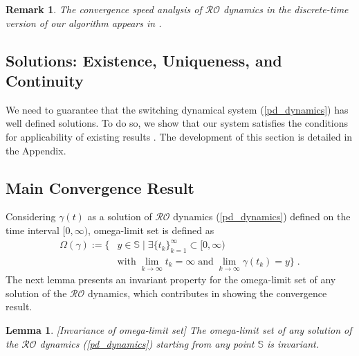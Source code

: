 \documentclass[journal,twoside,web]{ieeecolor}
\newcommand{\rev}[1]{\textcolor{revisionblue}{#1}}
\newtheorem{lemma}{Lemma}
\newtheorem{remark}{Remark}
\begin{document}
\begin{remark} \label{convergence_speed}
The convergence speed analysis of $\mathcal{RO}$ dynamics in the discrete-time version of our algorithm appears in \cite{ebrahimi2019cdc}.
\end{remark}

\subsection*{\rev{Solutions: Existence, Uniqueness, and Continuity}}
We need to guarantee that the switching dynamical system (\ref{pd_dynamics}) has well defined solutions.
To do so, we show that our system satisfies the conditions for applicability of existing results \cite{cherukuri2016}. The development of this section is detailed in the Appendix.

\subsection*{\rev{Main Convergence Result}}
Considering $\gamma(t)$ as a solution of $\mathcal{RO}$ dynamics (\ref{pd_dynamics}) defined on the time interval $[0,\infty)$, omega-limit set is defined as
\begin{align} \label{omega_limit}
\Omega(\gamma):=\{& y \in \mathbb S \;|\; \exists \{t_k\}_{k=1}^\infty \subset [0,\infty) \nonumber\\
&\text{with}\; \lim_{k \rightarrow \infty} t_k=\infty \;\text{and}\; \lim_{k \rightarrow \infty} \gamma(t_k)=y\}\;.
\end{align}
The next lemma presents an invariant property for the omega-limit set of any solution of the $\mathcal{RO}$ dynamics, which contributes in showing the convergence result.
\begin{lemma}\cite[Lemma~4.4]{cherukuri2016}[Invariance of omega-limit set]
The omega-limit set of any solution of the $\mathcal{RO}$ dynamics (\ref{pd_dynamics}) starting from any point $\mathbb S$ is invariant.
\label{omega_invariance}
\end{lemma}
\end{document}
